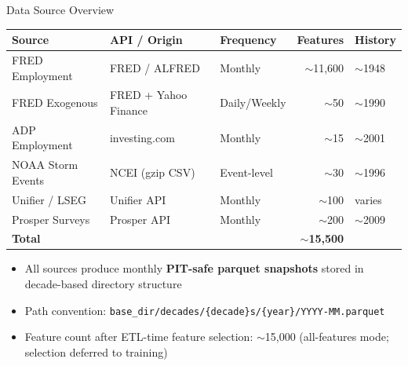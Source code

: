 \documentclass[aspectratio=169,10pt]{beamer}
\begin{document}
\begin{frame}{Data Source Overview}
\begin{center}
\footnotesize
\begin{tabular}{@{}lllrl@{}}
\toprule
\textbf{Source} & \textbf{API / Origin} & \textbf{Frequency} & \textbf{Features} & \textbf{History} \\
\midrule
FRED Employment  & FRED / ALFRED & Monthly & $\sim$11{,}600 & $\sim$1948 \\
FRED Exogenous   & FRED + Yahoo Finance & Daily/Weekly & $\sim$50 & $\sim$1990 \\
ADP Employment   & investing.com & Monthly & $\sim$15 & $\sim$2001 \\
NOAA Storm Events & NCEI (gzip CSV) & Event-level & $\sim$30 & $\sim$1996 \\
Unifier / LSEG   & Unifier API & Monthly & $\sim$100 & varies \\
Prosper Surveys  & Prosper API & Monthly & $\sim$200 & $\sim$2009 \\
\midrule
\textbf{Total}   & & & $\sim$\textbf{15{,}500} & \\
\bottomrule
\end{tabular}
\end{center}

\vspace{0.2cm}
\begin{itemize}\footnotesize
  \item All sources produce monthly \textbf{PIT-safe parquet snapshots} stored in decade-based directory structure
  \item Path convention: \texttt{base\_dir/decades/\{decade\}s/\{year\}/YYYY-MM.parquet}
  \item Feature count after ETL-time feature selection: $\sim$15{,}000 (all-features mode; selection deferred to training)
\end{itemize}
\end{frame}
\end{document}
